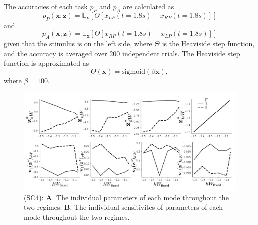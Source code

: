 \documentclass[11pt]{article}
\begin{document}
The accuracies of each task $p_P$ and $p_A$ are calculated as
\begin{equation}
p_P(\mathbf{x}; \mathbf{z}) = \mathbb{E}_{\mathbf{x}}\left[\Theta[x_{LP}(t=1.8s) - x_{RP}(t=1.8s)]\right]
\end{equation}
and 
\begin{equation}
p_A(\mathbf{x}; \mathbf{z}) = \mathbb{E}_{\mathbf{x}}\left[\Theta[x_{RP}(t=1.8s) - x_{LP}(t=1.8s)]\right]
\end{equation}
given that the stimulus is on the left side, where $\Theta$ is the Heaviside step function, and the accuracy is averaged over 200 independent trials.  The Heaviside step function is approximated as
\begin{equation}
\Theta(\mathbf{x}) = \text{sigmoid}(\beta \mathbf{x}),
\end{equation}
where $\beta = 100$.

\begin{figure}
\begin{center}
\includegraphics[scale=0.8]{figures/figSC4/figSC4.pdf}
\end{center}
\caption{\small (SC4):  \textbf{A}. The individual parameters of each mode throughout the two regimes.
\textbf{B}. The individual sensitivites of parameters of each mode throughout the two regimes.
}
\label{fig:SC4}
\end{figure}
\end{document}
